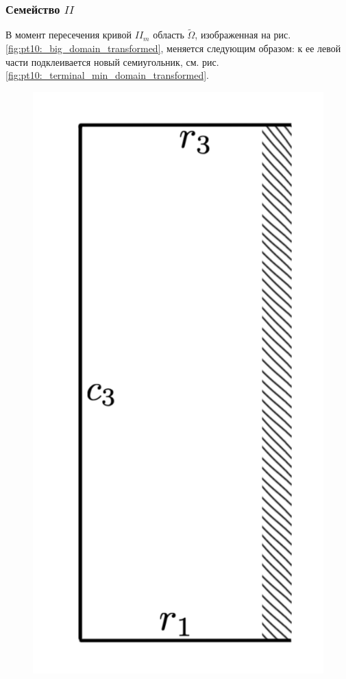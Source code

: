  \subsubsection{Семейство $II$}
 В момент пересечения кривой $II_m$ область $\widetilde{\Omega}$, изображенная на рис.     \ref{fig:pt10:_big_domain_transformed}, меняется следующим образом:
 к ее левой части подклеивается новый семиугольник, см. рис.     \ref{fig:pt10:_terminal_min_domain_transformed}.
 \begin{figure}[!htb]
\centering
\includegraphics[scale=0.12]{images/ch4/section3_circular/atoms/II/before/before_page_segment.pdf}

\end{figure}

